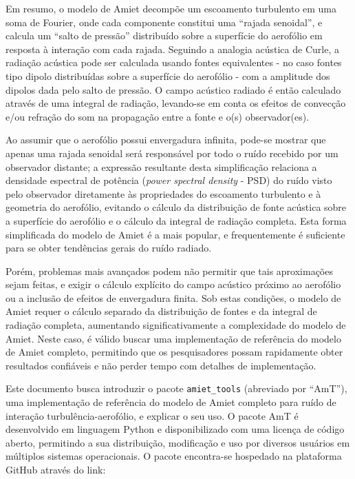 \documentclass[a4paper, 11pt, twoside]{article}
\begin{document}
Em resumo, o modelo de Amiet decompõe um escoamento turbulento em uma soma de Fourier, onde cada componente constitui uma ``rajada senoidal'', e calcula um ``salto de pressão'' distribuído sobre a superfície do aerofólio em resposta à interação com cada rajada. Seguindo a analogia acústica de Curle, a radiação acústica pode ser calculada usando fontes equivalentes - no caso fontes tipo dipolo distribuídas sobre a superfície do aerofólio - com a amplitude dos dipolos dada pelo salto de pressão. O campo acústico radiado é então calculado através de uma integral de radiação, levando-se em conta os efeitos de convecção e/ou refração do som na propagação entre a fonte e o(s) observador(es).

Ao assumir que o aerofólio possui envergadura infinita, pode-se mostrar que apenas uma rajada senoidal será responsável por todo o ruído recebido por um observador distante; a expressão resultante desta simplificação relaciona a densidade espectral de potência (\emph{power spectral density} - PSD) do ruído visto pelo observador diretamente às propriedades do escoamento turbulento e à geometria do aerofólio, evitando o cálculo da distribuição de fonte acústica sobre a superfície do aerofólio e o cálculo da integral de radiação completa. Esta forma simplificada do modelo de Amiet é a mais popular, e frequentemente é suficiente para se obter tendências gerais do ruído radiado. 

Porém, problemas mais avançados podem não permitir que tais aproximações sejam feitas, e exigir o cálculo explícito do campo acústico próximo ao aerofólio ou a inclusão de efeitos de envergadura finita. Sob estas condições, o modelo de Amiet requer o cálculo separado da distribuição de fontes e da integral de radiação completa, aumentando significativamente a complexidade do modelo de Amiet. Neste caso, é válido buscar uma implementação de referência do modelo de Amiet completo, permitindo que os pesquisadores possam rapidamente obter resultados confiáveis e não perder tempo com detalhes de implementação.

Este documento busca introduzir o pacote \verb|amiet_tools| (abreviado por ``AmT''), uma implementação de referência do modelo de Amiet completo para ruído de interação turbulência-aerofólio, e explicar o seu uso. O pacote AmT é desenvolvido em linguagem Python e disponibilizado com uma licença de código aberto, permitindo a sua distribuição, modificação e uso por diversos usuários em múltiplos sistemas operacionais. O pacote encontra-se hospedado na plataforma GitHub através do link:
\end{document}
